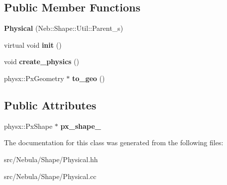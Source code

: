 \subsection*{\-Public \-Member \-Functions}
\begin{DoxyCompactItemize}
\item 
\hypertarget{classNeb_1_1Shape_1_1Physical_a565d6519bdd222615dbc0df773128211}{{\bfseries \-Physical} (\-Neb\-::\-Shape\-::\-Util\-::\-Parent\-\_\-s)}\label{classNeb_1_1Shape_1_1Physical_a565d6519bdd222615dbc0df773128211}

\item 
\hypertarget{classNeb_1_1Shape_1_1Physical_af52af144c95552ae55b6cc24bf4dfc59}{virtual void {\bfseries init} ()}\label{classNeb_1_1Shape_1_1Physical_af52af144c95552ae55b6cc24bf4dfc59}

\item 
\hypertarget{classNeb_1_1Shape_1_1Physical_a383490671f6f3792915196b643fcae3f}{void {\bfseries create\-\_\-physics} ()}\label{classNeb_1_1Shape_1_1Physical_a383490671f6f3792915196b643fcae3f}

\item 
\hypertarget{classNeb_1_1Shape_1_1Physical_ae2be5b67b617153a37ac2a7d32b629b9}{physx\-::\-Px\-Geometry $\ast$ {\bfseries to\-\_\-geo} ()}\label{classNeb_1_1Shape_1_1Physical_ae2be5b67b617153a37ac2a7d32b629b9}

\end{DoxyCompactItemize}
\subsection*{\-Public \-Attributes}
\begin{DoxyCompactItemize}
\item 
\hypertarget{classNeb_1_1Shape_1_1Physical_a42b1c4b3243313c543d08817cf4d7fdf}{physx\-::\-Px\-Shape $\ast$ {\bfseries px\-\_\-shape\-\_\-}}\label{classNeb_1_1Shape_1_1Physical_a42b1c4b3243313c543d08817cf4d7fdf}

\end{DoxyCompactItemize}


\-The documentation for this class was generated from the following files\-:\begin{DoxyCompactItemize}
\item 
src/\-Nebula/\-Shape/\-Physical.\-hh\item 
src/\-Nebula/\-Shape/\-Physical.\-cc\end{DoxyCompactItemize}
